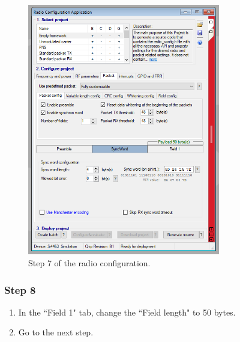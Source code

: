\begin{figure}[!h]
	\begin{center}
		\includegraphics[width=0.75\textwidth]{figures/wds-tutorial/wds-tutorial-7.png}
		\caption{Step 7 of the radio configuration.}
		\label{fig:wds-tutorial-step-7}
	\end{center}
\end{figure}

\subsubsection{Step 8}

\begin{enumerate}
    \item In the ``Field 1" tab, change the ``Field length" to 50 bytes.
    \item Go to the next step.
\end{enumerate}

